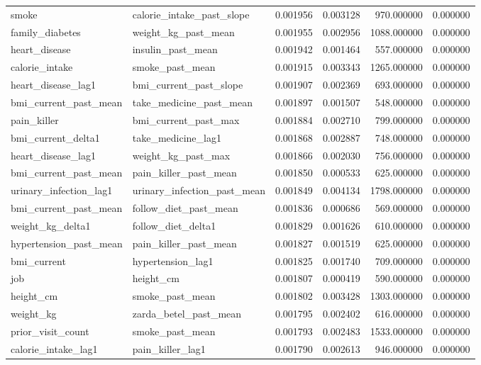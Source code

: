 \begin{longtable}{llrrrr}
smoke & calorie\_intake\_past\_slope & 0.001956 & 0.003128 & 970.000000 & 0.000000 \\
family\_diabetes & weight\_kg\_past\_mean & 0.001955 & 0.002956 & 1088.000000 & 0.000000 \\
heart\_disease & insulin\_past\_mean & 0.001942 & 0.001464 & 557.000000 & 0.000000 \\
calorie\_intake & smoke\_past\_mean & 0.001915 & 0.003343 & 1265.000000 & 0.000000 \\
heart\_disease\_lag1 & bmi\_current\_past\_slope & 0.001907 & 0.002369 & 693.000000 & 0.000000 \\
bmi\_current\_past\_mean & take\_medicine\_past\_mean & 0.001897 & 0.001507 & 548.000000 & 0.000000 \\
pain\_killer & bmi\_current\_past\_max & 0.001884 & 0.002710 & 799.000000 & 0.000000 \\
bmi\_current\_delta1 & take\_medicine\_lag1 & 0.001868 & 0.002887 & 748.000000 & 0.000000 \\
heart\_disease\_lag1 & weight\_kg\_past\_max & 0.001866 & 0.002030 & 756.000000 & 0.000000 \\
bmi\_current\_past\_mean & pain\_killer\_past\_mean & 0.001850 & 0.000533 & 625.000000 & 0.000000 \\
urinary\_infection\_lag1 & urinary\_infection\_past\_mean & 0.001849 & 0.004134 & 1798.000000 & 0.000000 \\
bmi\_current\_past\_mean & follow\_diet\_past\_mean & 0.001836 & 0.000686 & 569.000000 & 0.000000 \\
weight\_kg\_delta1 & follow\_diet\_delta1 & 0.001829 & 0.001626 & 610.000000 & 0.000000 \\
hypertension\_past\_mean & pain\_killer\_past\_mean & 0.001827 & 0.001519 & 625.000000 & 0.000000 \\
bmi\_current & hypertension\_lag1 & 0.001825 & 0.001740 & 709.000000 & 0.000000 \\
job & height\_cm & 0.001807 & 0.000419 & 590.000000 & 0.000000 \\
height\_cm & smoke\_past\_mean & 0.001802 & 0.003428 & 1303.000000 & 0.000000 \\
weight\_kg & zarda\_betel\_past\_mean & 0.001795 & 0.002402 & 616.000000 & 0.000000 \\
prior\_visit\_count & smoke\_past\_mean & 0.001793 & 0.002483 & 1533.000000 & 0.000000 \\
calorie\_intake\_lag1 & pain\_killer\_lag1 & 0.001790 & 0.002613 & 946.000000 & 0.000000 \\

\end{longtable}
